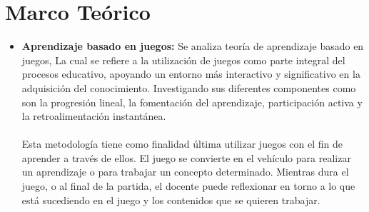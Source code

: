 \section{Marco Teórico}
\begin{itemize}
    \item \textbf{Aprendizaje basado en juegos:} Se analiza teoría de aprendizaje basado en juegos, La cual se refiere a la utilización de juegos como parte integral del procesos educativo, apoyando un entorno más interactivo y significativo en la adquisición del conocimiento. Investigando sus diferentes componentes como son la progresión lineal, la fomentación del aprendizaje, participación activa y la retroalimentación instantánea.
    \\ \\
Esta metodología tiene como finalidad última utilizar juegos con el fin de aprender a través de ellos. El juego se convierte en el vehículo para realizar un aprendizaje o para trabajar un concepto determinado. Mientras dura el juego, o al final de la partida, el docente puede reflexionar en torno a lo que está sucediendo en el juego y los contenidos que se quieren trabajar.\cite{f}

\end{itemize}

